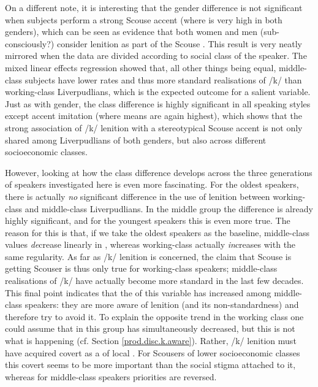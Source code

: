 On a different note, it is interesting that the gender difference is not significant when subjects perform a strong Scouse accent (where  is very high in both genders), which can be seen as evidence that both women and men (sub-consciously?) consider lenition as part of the Scouse .
This result is very neatly mirrored when the data are divided according to social class of the speaker.
The mixed linear effects regression showed that, all other things being equal, middle-class subjects have lower  rates and thus more standard realisations of /k/ than working-class Liverpudlians, which is the expected outcome for a salient variable.
Just as with gender, the class difference is highly significant in all speaking styles except accent imitation (where  means are again highest), which shows that the strong association of /k/ lenition with a stereotypical Scouse accent is not only shared among Liverpudlians of both genders, but also across different socioeconomic classes.

However, looking at how the class difference develops across the three generations of speakers investigated here is even more fascinating.
For the oldest speakers, there is actually \emph{no} significant difference in the use of lenition between working-class and middle-class Liverpudlians.
In the middle group the difference is already highly significant, and for the youngest speakers this is even more true.
The reason for this is that, if we take the oldest speakers as the baseline, middle-class  values \emph{de}crease linearly in , whereas working-class  actually \emph{in}creases with the same regularity.
As far as /k/ lenition is concerned, the claim that Scouse is getting Scouser is thus only true for working-class speakers; middle-class realisations of /k/ have actually become more standard in the last few decades.
This final point indicates that the  of this variable has increased among middle-class speakers: they are more aware of lenition (and its non-standardness) and therefore try to avoid it.
To explain the opposite trend in the working class one could assume that  in this group has simultaneously decreased, but this is not what is happening (cf. Section \ref{prod.disc.k.aware}).
Rather, /k/ lenition must have acquired covert  as a  of local .
For Scousers of lower socioeconomic classes this covert  seems to be more important than the social stigma attached to it, whereas for middle-class speakers priorities are reversed.

